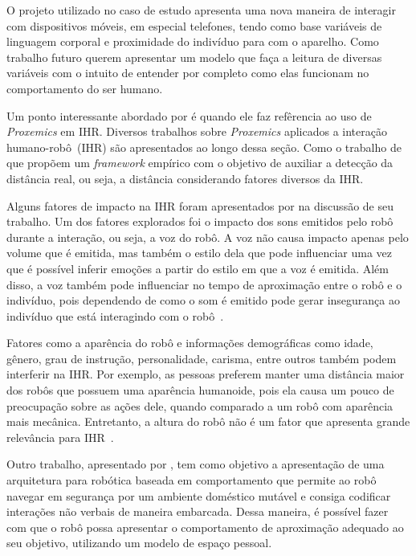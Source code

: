 O projeto utilizado no caso de estudo apresenta uma nova maneira de interagir com dispositivos móveis, em especial telefones, tendo como base variáveis de linguagem corporal e proximidade do indivíduo para com o aparelho. Como trabalho futuro \textcite{hemmert:2013} querem apresentar um modelo que faça a leitura de diversas variáveis com o intuito de entender por completo como elas funcionam no comportamento do ser humano.

Um ponto interessante abordado por \textcite{hemmert:2013} é quando ele faz refêrencia ao uso de \emph{Proxemics} em IHR. Diversos trabalhos sobre \emph{Proxemics} aplicados a interação humano-robô~(IHR) são apresentados ao longo dessa seção. Como o trabalho de \textcite{walters:2009} que propõem um \emph{framework} empírico com o objetivo de auxiliar a detecção da distância real, ou seja, a distância considerando fatores diversos da IHR.

Alguns fatores de impacto na IHR foram apresentados por \textcite{walters:2009} na discussão de seu trabalho. Um dos fatores explorados foi o impacto dos sons emitidos pelo robô durante a interação, ou seja, a voz do robô. A voz não causa impacto apenas pelo volume que é emitida, mas também o estilo dela que pode influenciar uma vez que é possível inferir emoções a partir do estilo em que a voz é emitida. Além disso, a voz também pode influenciar no tempo de aproximação entre o robô e o indivíduo, pois dependendo de como o som é emitido pode gerar insegurança ao indivíduo que está interagindo com o robô~\cite{walters:2009}.

Fatores como a aparência do robô e informações demográficas como idade, gênero, grau de instrução, personalidade, carisma, entre outros também podem interferir na IHR. Por exemplo, as pessoas preferem manter uma distância maior dos robôs que possuem uma aparência humanoide, pois ela causa um pouco de preocupação sobre as ações dele, quando comparado a um robô com aparência mais mecânica. Entretanto, a altura do robô não é um fator que apresenta grande relevância para IHR~\cite{walters:2009}.

Outro trabalho, apresentado por \textcite{torta:2011}, tem como objetivo a apresentação de uma arquitetura para robótica baseada em comportamento que permite ao robô navegar em segurança por um ambiente doméstico mutável e consiga codificar interações não verbais de maneira embarcada. Dessa maneira, é possível fazer com que o robô possa apresentar o comportamento de aproximação adequado ao seu objetivo, utilizando um modelo de espaço pessoal.

